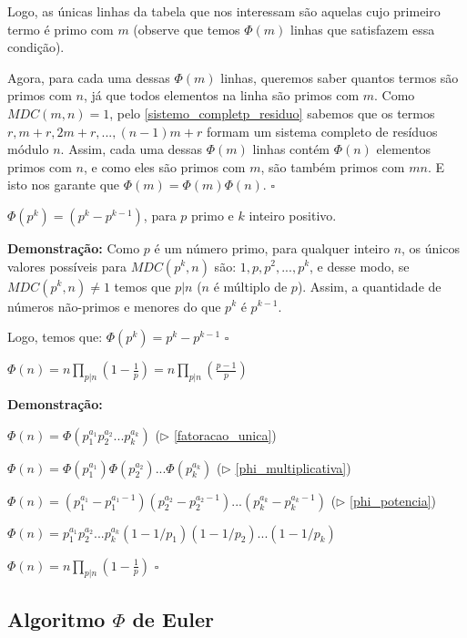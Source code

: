 Logo, as únicas linhas da tabela que nos interessam são aquelas cujo primeiro termo é primo com $m$ (observe que temos $\Phi(m)$
linhas que satisfazem essa condição).

Agora, para cada uma dessas $\Phi(m)$ linhas, queremos saber quantos termos são primos com $n$, já que todos elementos na linha são
primos com $m$. Como $MDC(m,n) = 1$, pelo \autoref{sistemo_completp_residuo} sabemos que os termos $r,m+r,2m+r,...,(n-1)m+r$ formam um sistema completo de resíduos módulo $n$.
Assim, cada uma dessas $\Phi(m)$ linhas contém $\Phi(n)$ elementos primos com $n$, e como eles são primos com $m$, são também
primos com $mn$. E isto nos garante que $\Phi(m) = \Phi(m)\Phi(n)$. $\square$


\begin{theorem}\label{phi_potencia}
$\Phi(p^k) = (p^k - p^{k-1})$, para $p$ primo e $k$ inteiro positivo.
\end{theorem}
\textbf{Demonstração:}
Como $p$ é um número primo, para qualquer inteiro $n$, os únicos valores possíveis para $MDC(p^k,n)$ são: $1, p, p^2,...,p^k$, 
e desse modo, se $MDC(p^k,n)\neq1$ temos que $p|n$ ($n$ é múltiplo de $p$). Assim, a quantidade de números não-primos e menores do que $p^k$ é $p^{k-1}$.

Logo, temos que: $\Phi(p^k) = p^k - p^{k-1}$ $\square$




\begin{theorem}\label{formula_produto_euler}
$\Phi(n) = n \prod_{p|n}(1 - \frac{1}{p}) = n \prod_{p|n}(\frac{p-1}{p})$
\end{theorem}
\textbf{Demonstração:}

$\Phi(n) = \Phi(p_1^{a_1}p_2^{a_2}...p_k^{a_k})$ ($\triangleright$ \autoref{fatoracao_unica})

$\Phi(n) = \Phi(p_1^{a_1})\Phi(p_2^{a_2})...\Phi(p_k^{a_k})$ ($\triangleright$ \autoref{phi_multiplicativa})

$\Phi(n) = (p_1^{a_1} - p_1^{a_1-1})(p_2^{a_2} - p_2^{a_2-1})...(p_k^{a_k} - p_k^{a_k-1})$ ($\triangleright$ \autoref{phi_potencia})

$\Phi(n) = p_1^{a_1}p_2^{a_2}...p_k^{a_k}(1 - 1/p_1)(1 - 1/p_2)...(1 - 1/p_k)$

$\Phi(n) = n \prod_{p|n}(1 - \frac{1}{p})$ $\square$\\

\subsection{Algoritmo $\Phi$ de Euler}

